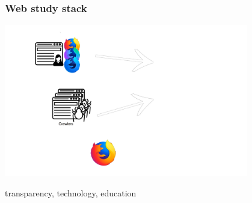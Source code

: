 \documentclass[aspectratio=169]{beamer}
\renewcommand{\LARGE}{\fontsize{31pt}{42pt}\selectfont}
\begin{document}
{
%
\begin{frame}
\frametitle{Web study stack}
\includegraphics[width=0.8\textwidth]{flow.png}
\end{frame}
}

\begin{frame}
transparency, technology, education


\end{frame}

{
%
\begin{frame}
\vfill
\LARGE{https://github.com/mozilla/}\\
\LARGE{overscripted/}
\end{frame}
}
\end{document}
